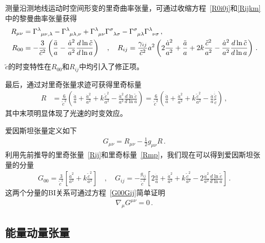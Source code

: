 \documentclass[jkps,preprint,fleqn]{revtex4}
\newcommand{\tc}{\tilde{c}}
\begin{document}
\begin{CJK*}{UTF8}{gbsn}
测量沿测地线运动时空间形变的里奇曲率张量，可通过收缩方程~\eqref{R0i0j}和\eqref{Rijkm}中的黎曼曲率张量获得
\begin{align}
R_{\mu\nu} &= \tensor{\Gamma}{^\lambda_\mu_\nu_,_\lambda} - \tensor{\Gamma}{^\lambda_\mu_\lambda_,_\nu} + \tensor{\Gamma}{^\lambda_\mu_\nu} \tensor{\Gamma}{^\sigma_\lambda_\sigma} - \tensor{\Gamma}{^\sigma_\mu_\lambda} \tensor{\Gamma}{^\lambda_\nu_\sigma} \label{Rmn} \,, \\ R_{00} &= -\frac{3}{\tc^2} \left( \frac{\ddot{a}}{a} - \frac{\dot{a}^2}{a^2} \frac{d \ln \tc}{ d \ln a}  \right) \quad , \quad R_{ij} = \frac{\gamma_{ij}}{\tc^2} a^2 \left( 2 \frac{\dot{a}^2}{a^2} + \frac{\ddot{a}}{a} + 2 k \frac{\tc^2}{a^2} - \frac{\dot{a}^2}{a^2} \frac{d \ln \tc}{ d \ln a}  \right) \label{Rij} \,. \end{align}
$\tc$的时变特性在$R_{00}$和$R_{ij}$中均引入了修正项。

最后，通过对里奇张量求迹可获得里奇标量
\begin{align} R &= \frac{6}{\tc^2} \left( \frac{\ddot{a}}{a} + \frac{\dot{a}^2}{a^2} + k \frac{\tc^2}{a^2} - \frac{\dot{a}^2}{a^2} \frac{d \ln \tc}{ d \ln a}  \right) =  \frac{6}{\tc^2} \left( \frac{\ddot{a}}{a} + \frac{\dot{a}^2}{a^2} + k \frac{\tc^2}{a^2} - \frac{\dot{a}}{a} \frac{\dot{\tc}}{\tc}  \right)  \label{Rmp} \,, \end{align}
其中末项明显体现了光速的时变效应。

爱因斯坦张量定义如下
\begin{align}
G_{\mu\nu} = R_{\mu\nu} - \frac{1}{2} g_{\mu\nu} R \label{Gmunu} \,.
\end{align}
利用先前推导的里奇张量~\eqref{Rij}和里奇标量~\eqref{Rmp}，我们现在可以得到爱因斯坦张量的分量
\begin{align}
G_{00} = \frac{3}{\tc^2} \left[ \frac{\dot{a}^2}{a^2} + k \frac{\tc^2}{a^2} \right] \quad , \quad G_{ij} = -\frac{g_{ij}}{\tc^2} \left[ 2 \frac{\ddot{a}}{a} + \frac{\dot{a}^2}{a^2} + k \frac{\tc^2}{a^2} - 2 \frac{\dot{a}^2}{a^2} \frac{d \ln \tc}{d \ln a} \right] \,. \label{G00Gij}
\end{align}
这两个分量的BI关系可通过方程~\eqref{G00Gij}简单证明
\begin{align}
\nabla_{\mu} G^{\mu \nu} = 0 \label{nablaGmunu} \,.
\end{align}
\subsection{能量动量张量}\label{subsec:Tmunu}


\end{CJK*}
\end{document}
